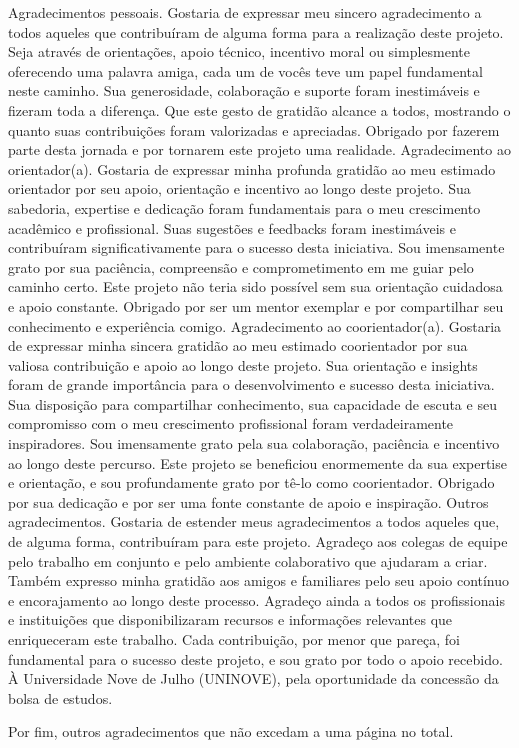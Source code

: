 \centeredchapterstyle
\begin{agradecimentos}
    \noindent Agradecimentos pessoais. \newline
Gostaria de expressar meu sincero agradecimento a todos aqueles que contribuíram de alguma forma para a realização deste projeto. Seja através de orientações, apoio técnico, incentivo moral ou simplesmente oferecendo uma palavra amiga, cada um de vocês teve um papel fundamental neste caminho. Sua generosidade, colaboração e suporte foram inestimáveis e fizeram toda a diferença. Que este gesto de gratidão alcance a todos, mostrando o quanto suas contribuições foram valorizadas e apreciadas. Obrigado por fazerem parte desta jornada e por tornarem este projeto uma realidade.
    \noindent Agradecimento ao orientador(a).\newline
    Gostaria de expressar minha profunda gratidão ao meu estimado orientador por seu apoio, orientação e incentivo ao longo deste projeto. Sua sabedoria, expertise e dedicação foram fundamentais para o meu crescimento acadêmico e profissional. Suas sugestões e feedbacks foram inestimáveis e contribuíram significativamente para o sucesso desta iniciativa. Sou imensamente grato por sua paciência, compreensão e comprometimento em me guiar pelo caminho certo. Este projeto não teria sido possível sem sua orientação cuidadosa e apoio constante. Obrigado por ser um mentor exemplar e por compartilhar seu conhecimento e experiência comigo.
    \noindent Agradecimento ao coorientador(a).\newline
    Gostaria de expressar minha sincera gratidão ao meu estimado coorientador por sua valiosa contribuição e apoio ao longo deste projeto. Sua orientação e insights foram de grande importância para o desenvolvimento e sucesso desta iniciativa. Sua disposição para compartilhar conhecimento, sua capacidade de escuta e seu compromisso com o meu crescimento profissional foram verdadeiramente inspiradores. Sou imensamente grato pela sua colaboração, paciência e incentivo ao longo deste percurso. Este projeto se beneficiou enormemente da sua expertise e orientação, e sou profundamente grato por tê-lo como coorientador. Obrigado por sua dedicação e por ser uma fonte constante de apoio e inspiração.
    \noindent Outros agradecimentos.\newline
    Gostaria de estender meus agradecimentos a todos aqueles que, de alguma forma, contribuíram para este projeto. Agradeço aos colegas de equipe pelo trabalho em conjunto e pelo ambiente colaborativo que ajudaram a criar. Também expresso minha gratidão aos amigos e familiares pelo seu apoio contínuo e encorajamento ao longo deste processo. Agradeço ainda a todos os profissionais e instituições que disponibilizaram recursos e informações relevantes que enriqueceram este trabalho. Cada contribuição, por menor que pareça, foi fundamental para o sucesso deste projeto, e sou grato por todo o apoio recebido.
    \noindent À Universidade Nove de Julho (UNINOVE), pela oportunidade da concessão da bolsa de estudos.\newline
    
    \noindent Por fim, outros agradecimentos que não excedam a uma página no total.
\end{agradecimentos}
